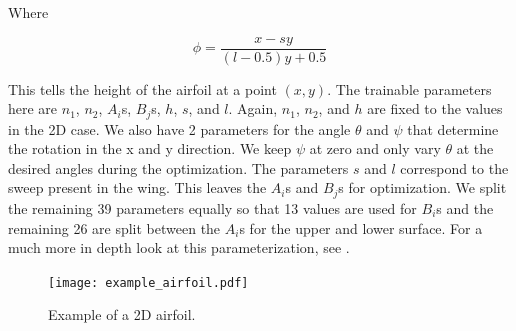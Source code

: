 \documentclass{article} %
\begin{document}
Where

\begin{equation}
  \phi = \frac{x - s y}{(l - 0.5) y + 0.5}
\end{equation}

This tells the height of the airfoil at a point $(x,y)$. The trainable parameters here are $n_1$, $n_2$, $A_i$s, $B_j$s, $h$, $s$, and $l$. Again, $n_1$, $n_2$, and $h$ are fixed to the values in the 2D case. We also have 2 parameters for the angle $\theta$ and $\psi$ that determine the rotation in the x and y direction. We keep $\psi$ at zero and only vary $\theta$ at the desired angles during the optimization. The parameters $s$ and $l$ correspond to the sweep present in the wing. This leaves the $A_i$s and $B_j$s for optimization. We split the remaining 39 parameters equally so that 13 values are used for $B_i$s and the remaining 26 are split between the $A_i$s for the upper and lower surface. For a much more in depth look at this parameterization, see \citet{lane2009surface}.

\begin{figure}[!h]
\begin{center}
\texttt{[image: example\_airfoil.pdf]}
\end{center}
\caption{Example of a 2D airfoil.}
\label{example_airfoil}
\end{figure}
\end{document}
